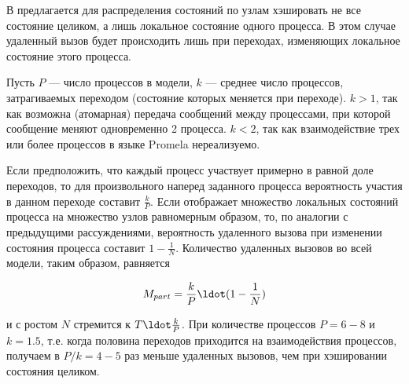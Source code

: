 В \cite{LT99} предлагается для распределения состояний по узлам
хэшировать не все состояние целиком, а лишь локальное состояние одного
процесса. В этом случае удаленный вызов будет происходить лишь при
переходах, изменяющих локальное состояние этого процесса.

Пусть $P$ — число процессов в модели, $k$ — среднее число процессов,
затрагиваемых переходом (состояние которых меняется при переходе). $k
> 1$, так как возможна (атомарная) передача сообщений между
процессами, при которой сообщение меняют одновременно 2 процесса. $k <
2$, так как взаимодействие трех или более процессов в языке Promela
нереализуемо.

Если предположить, что каждый процесс участвует примерно в равной доле
переходов, то для произвольного наперед заданного процесса вероятность
участия в данном переходе составит $\frac{k}{P}$. Если
 отображает множество локальных состояний процесса на
множество узлов равномерным образом, то, по аналогии с предыдущими
рассуждениями, вероятность удаленного вызова при изменении состояния
процесса составит $1 - \frac{1}{N}$. Количество удаленных вызовов во
всей модели, таким образом, равняется

\begin{equation}
  \label{eq:nmsg-firstproc-hash}
  M_{part} = \frac{k}{P} \ldot (1 - \frac{1}{N})
\end{equation}

и с ростом $N$ стремится к $T \ldot \frac{k}{P}$. При
количестве процессов $P = 6-8$ и $k = 1.5$, т.е. когда половина переходов
приходится на взаимодействия процессов, получаем в $P/k = 4-5$ раз
меньше удаленных вызовов, чем при хэшировании состояния целиком.

